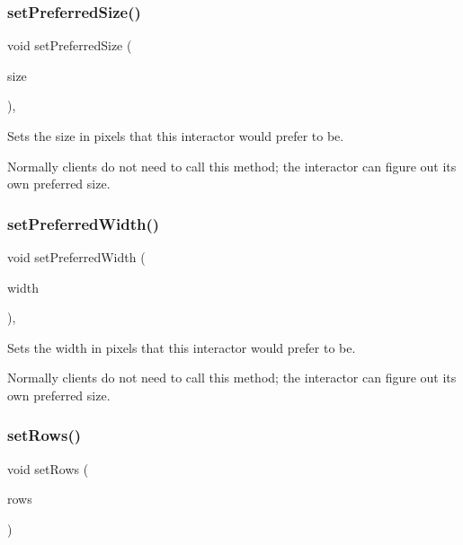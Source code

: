 \subsubsection{\texorpdfstring{set\+Preferred\+Size()}{setPreferredSize()}\hspace{0.1cm}{\footnotesize\ttfamily [2/2]}}
{\footnotesize\ttfamily void set\+Preferred\+Size (\begin{DoxyParamCaption}\item[{const \mbox{\hyperlink{classGDimension}{G\+Dimension}} \&}]{size }\end{DoxyParamCaption})\hspace{0.3cm}{\ttfamily [virtual]}, {\ttfamily [inherited]}}



Sets the size in pixels that this interactor would prefer to be. 

Normally clients do not need to call this method; the interactor can figure out its own preferred size. \mbox{\label{classGInteractor_a3db429ab2fa52efd187eec0ed8cdd9f2}} 
\subsubsection{\texorpdfstring{set\+Preferred\+Width()}{setPreferredWidth()}}
{\footnotesize\ttfamily void set\+Preferred\+Width (\begin{DoxyParamCaption}\item[{double}]{width }\end{DoxyParamCaption})\hspace{0.3cm}{\ttfamily [virtual]}, {\ttfamily [inherited]}}



Sets the width in pixels that this interactor would prefer to be. 

Normally clients do not need to call this method; the interactor can figure out its own preferred size. \mbox{\label{classGTextArea_a508bbe326657af6d3add84deb4595989}} 
\subsubsection{\texorpdfstring{set\+Rows()}{setRows()}}
{\footnotesize\ttfamily void set\+Rows (\begin{DoxyParamCaption}\item[{int}]{rows }\end{DoxyParamCaption})\hspace{0.3cm}{\ttfamily [virtual]}}



